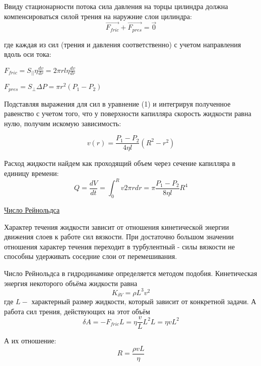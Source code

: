 \documentclass{article}
\begin{document}
Ввиду стационарности потока сила давления на торцы цилиндра должна компенсироваться силой трения на наружние слои цилиндра:
\begin{equation}
    \overrightarrow{F_{fric}} + \overrightarrow{F_{pres}} = \overrightarrow{0}
\end{equation}

где каждая из сил (трения и давления соответственно) с учетом направления вдоль оси тока:
\begin{center}
    \(F_{fric} = S_{||} \eta\frac{dv}{dr} = 2\pi r l \eta\frac{dv}{dr}\)
\end{center}
\begin{center}
    \(F_{pres} = S_{\perp}\Delta P = \pi r^{2} (P_{1} - P_{2})\)
\end{center}

Подставляя выражения для сил в уравнение (1) и интегрируя полученное равенство с учетом того, что у поверхности капилляра скорость жидкости равна нулю, получим искомую зависимость:

\begin{equation}
    v(r) = \frac{P_{1} - P_{2}}{4\eta l}(R^{2} - r^{2})
\end{equation}

Расход жидкости найдем как проходящий объем через сечение капилляра в единицу времени:
\begin{equation}
    Q = \frac{dV}{dt} = \int_{0}^{R} v 2 \pi rdr = \pi \frac{P_{1} - P_{2}}{8 \eta l} R^{4}
\end{equation}

\begin{center}
    \raggedright
    {
        \large{\underline{Число Рейнольдса}}
    }
\end{center}

Характер течения жидкости зависит от отношения кинетической энергии движения слоев к работе сил вязкости. При достаточно большом значении отношения характер течения переходит в турбулентный - силы вязкости не способны удерживать соседние слои от перемешивания.

Число Рейнольдса в гидродинамике определяется методом подобия. Кинетическая энергия некоторого объёма жидкости равна
\[K_{\delta V} = \rho L^{3} v^{2}\]
где \(L -\) характерный размер жидкости, который зависит от конкретной задачи. А работа сил трения, действующих на этот объём \[\delta A = -F_{fric} L = \eta \frac{v}{L} L^{2} L = \eta v L^{2}\]

А их отношение:
\begin{equation}
    R = \frac{\rho v L}{\eta}
\end{equation}
\end{document}
